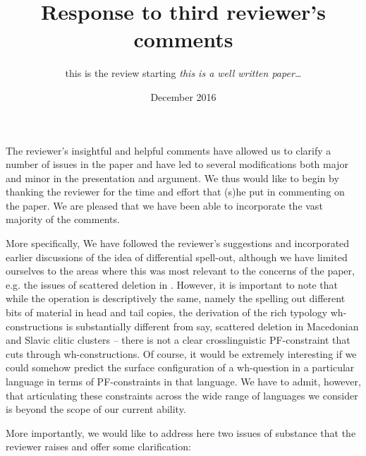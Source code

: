 \documentclass[11pt]{article}
\begin{document}
\title{Response to third reviewer's comments}
\author{this is the review starting \textit{this is a well written paper\ldots}}
\date{December 2016}

\maketitle


The reviewer's insightful and helpful comments have allowed us to clarify a number of issues in the paper and have led to several modifications both major and minor in the presentation and argument. We thus would like to begin by thanking the reviewer for the time and effort that (s)he put in commenting on the paper. We are pleased that we have been able to incorporate the vast majority of the comments.

More specifically, We have followed the reviewer's suggestions and incorporated earlier discussions of the idea of differential spell-out, although we have limited ourselves to the areas where this was most relevant to the concerns of the paper, e.g. the issues of scattered deletion in \cite{Bovskovic-Nunes:2007}. However, it is important to note that while the operation is descriptively the same, namely the spelling out different bits of material in head and tail copies, the derivation of the rich typology wh-constructions is substantially different from say, scattered deletion in Macedonian and Slavic clitic clusters -- there is not a clear crosslinguistic PF-constraint that cuts through wh-constructions. Of course, it would be extremely interesting if we could somehow predict the surface configuration of a wh-question in a particular language in terms of PF-constraints in that language. We have to admit, however, that articulating these constraints across the wide range of languages we consider is beyond the scope of our current ability.

More importantly, we would like to address here two issues of substance that the reviewer raises and offer some clarification:
\end{document}
